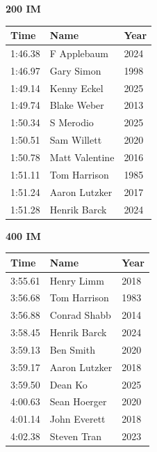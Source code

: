 \vspace{1.2em}
\noindent\begin{minipage}[t]{0.48\textwidth}
\centering
\textbf{\textcolor{teamprimary}{200 IM}}\par
\vspace{0.5em}
\centering
\small
\renewcommand{\arraystretch}{1.0}
\setlength{\tabcolsep}{4pt}
\begin{tabular}{@{}p{1.8cm}p{3.0cm}p{1.0cm}@{}}
\toprule
\textbf{Time} & \textbf{Name} & \textbf{Year} \\
\midrule
1:46.38 & F Applebaum & 2024 \\
1:46.97 & Gary Simon & 1998 \\
1:49.14 & Kenny Eckel & 2025 \\
1:49.74 & Blake Weber & 2013 \\
1:50.34 & S Merodio & 2025 \\
1:50.51 & Sam Willett & 2020 \\
1:50.78 & Matt Valentine & 2016 \\
1:51.11 & Tom Harrison & 1985 \\
1:51.24 & Aaron Lutzker & 2017 \\
1:51.28 & Henrik Barck & 2024 \\
\bottomrule
\end{tabular}
\end{minipage}
\hfill
\begin{minipage}[t]{0.48\textwidth}
\centering
\textbf{\textcolor{teamprimary}{400 IM}}\par
\vspace{0.5em}
\centering
\small
\renewcommand{\arraystretch}{1.0}
\setlength{\tabcolsep}{4pt}
\begin{tabular}{@{}p{1.8cm}p{3.0cm}p{1.0cm}@{}}
\toprule
\textbf{Time} & \textbf{Name} & \textbf{Year} \\
\midrule
3:55.61 & Henry Limm & 2018 \\
3:56.68 & Tom Harrison & 1983 \\
3:56.88 & Conrad Shabb & 2014 \\
3:58.45 & Henrik Barck & 2024 \\
3:59.13 & Ben Smith & 2020 \\
3:59.17 & Aaron Lutzker & 2018 \\
3:59.50 & Dean Ko & 2025 \\
4:00.63 & Sean Hoerger & 2020 \\
4:01.14 & John Everett & 2018 \\
4:02.38 & Steven Tran & 2023 \\
\bottomrule
\end{tabular}
\end{minipage}
